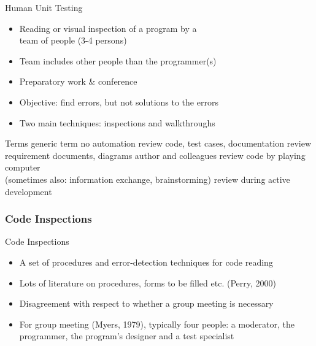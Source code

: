 \begin{Frame}{Human Unit Testing}
  \begin{itemize}
    \item Reading or visual inspection of a program by a\\
      \alert{team of people} (3-4 persons)
    \item Team includes other people than the programmer(s)
    \item Preparatory work \& conference
    \item Objective: find errors, but not solutions to the errors
    \item Two main techniques: \alert{inspections} and \alert{walkthroughs}
  \end{itemize}
\end{Frame}

\begin{Frame}{Terms}
   generic term\hfill\vspace{1ex}\linebreak
   no automation\hfill\vspace{1ex}\linebreak
   review code, test cases, documentation\hfill\vspace{1ex}\linebreak
   review requirement documents, diagrams\hfill\vspace{1ex}\linebreak
   author and colleagues\hfill\vspace{1ex}\linebreak
   review code by playing computer\\
  (sometimes also: information exchange, brainstorming)\hfill\vspace{1ex}\linebreak
   review during active development
\end{Frame}

\subsubsection*{Code Inspections}

\begin{Frame}{Code Inspections}
  \begin{itemize}
    \item A set of procedures and error-detection techniques for code reading
    \item Lots of literature on procedures, forms to be filled etc. (Perry, 2000)
    \item Disagreement with respect to whether a group meeting is necessary
    \item For group meeting (Myers, 1979), typically four people: a \alert{moderator}, the \alert{programmer},
    the \alert{program's designer} and a \alert{test specialist}
  \end{itemize}
\end{Frame}

